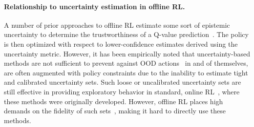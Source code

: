 \paragraph{Relationship to uncertainty estimation in offline RL.} 
A number of prior approaches to offline RL estimate some sort of epistemic uncertainty to determine the trustworthiness of a Q-value prediction~\citep{kumar2019stabilizing,fujimoto2018off,agarwal2019optimistic,levine2020offline}.
The policy is then optimized with respect to lower-confidence estimates derived using the uncertainty metric. However, it has been empirically noted that uncertainty-based methods are not sufficient to prevent against OOD actions~\citep{fujimoto2018off,kumar2019stabilizing} in and of themselves, are often augmented with policy constraints due to the inability to estimate tight and calibrated uncertainty sets. Such loose or uncalibrated uncertainty sets are still effective in providing exploratory behavior in standard, online RL~\citep{osband2016deep,osband2017posterior}, where these methods were originally developed. However, offline RL places high demands on the fidelity of such sets~\citep{levine2020offline}, making it hard to directly use these methods.

